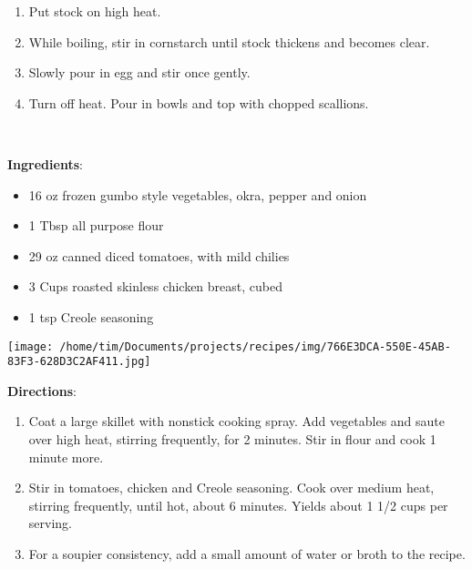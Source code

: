 \documentclass[11pt, twoside, openany]{book}
\begin{document}
\vspace{-3mm}\begin{enumerate}\setlength\itemsep{-1mm}
\item Put stock on high heat.
\item While boiling, stir in cornstarch until stock thickens and becomes clear.
\item Slowly pour in egg and stir once gently.
\item Turn off heat. Pour in bowls and top with chopped scallions.
\end{enumerate}
 \label{chicken-gumbo}\hfill\textit{}\\
\begin{minipage}[t]{0.8\linewidth}
\textbf{Ingredients}:\vspace{-3mm}
\begin{multicols}{2}
\begin{itemize}\setlength\itemsep{-1mm}
\item 16 oz frozen gumbo style vegetables, okra, pepper and onion
\item 1 Tbsp all purpose flour
\item 29 oz canned diced tomatoes, with mild chilies
\item 3 Cups roasted skinless chicken breast, cubed
\item 1 tsp Creole seasoning
\end{itemize}
\end{multicols}
\end{minipage}
\begin{minipage}[t]{0.2\linewidth}
\centering \strut\vspace*{-\baselineskip}\newline
\texttt{[image: /home/tim/Documents/projects/recipes/img/766E3DCA-550E-45AB-83F3-628D3C2AF411.jpg]}\\
\end{minipage}\vspace{3mm}
\textbf{Directions}:
\vspace{-3mm}\begin{enumerate}\setlength\itemsep{-1mm}
\item Coat a large skillet with nonstick cooking spray. Add vegetables and saute over high heat, stirring frequently, for 2 minutes. Stir in flour and cook 1 minute more. 
\item Stir in tomatoes, chicken and Creole seasoning. Cook over medium heat, stirring frequently, until hot, about 6 minutes. Yields about 1 1/2 cups per serving.
\item For a soupier consistency, add a small amount of water or broth to the recipe.
\end{enumerate}
\end{document}
